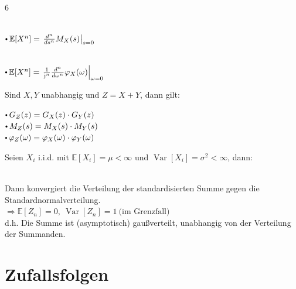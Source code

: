 \documentclass[8pt,a4paper,landscape]{extarticle}
\begin{document}
\begin{multicols*}{6}

\vspace*{3pt}
 \\

\vspace*{-7pt}
\CheatsheetItemListStart
\CheatsheetItemListEnd
$\sbullet \mathbb{E}[X^n] = \left.\frac{d^n}{ds^n}M_X(s)\right|_{s=0}$

\vspace*{-6pt}
 \\
\vspace*{-9pt}
\CheatsheetItemListStart
\CheatsheetItemListEnd
$\sbullet \mathbb{E}[X^n] = \left.\frac{1}{\mathrm{j}^n}\frac{d^n}{d\omega^n}\varphi_X(\omega)\right|_{\omega=0}$


Sind $X,Y$ unabhangig und $Z=X+Y$, dann gilt:

$\sbullet G_Z(z)=G_X(z)\cdot G_Y(z)$ \\
$\sbullet M_Z(s)=M_X(s)\cdot M_Y(s)$ \\
$\sbullet \varphi_Z(\omega)=\varphi_X(\omega)\cdot \varphi_Y(\omega)$


Seien $X_i$ i.i.d. mit $\mathbb{E}[X_i]=\mu<\infty$ und $\operatorname{Var}[X_i]=\sigma^2<\infty$, dann:
\vspace*{-5pt} \par
{} \\
Dann konvergiert die Verteilung der standardisierten Summe gegen die Standardnormalverteilung. \\
$\Rightarrow \mathbb{E}[Z_n]=0,\ \operatorname{Var}[Z_n]=1\ \text{(im Grenzfall)}$ \\
d.h. Die Summe ist (asymptotisch) gaußverteilt, unabhangig von der Verteilung der Summanden.


\columnbreak

\section{Zufallsfolgen}


\end{multicols*}
\end{document}
